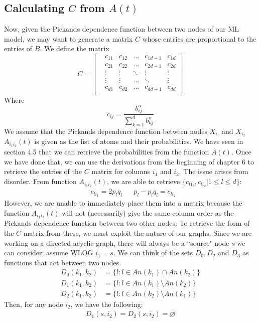 \documentclass[12pt]{article}
\theoremstyle{definition}
\theoremstyle{definition}
\begin{document}
\subsection{Calculating $C$ from $A(t)$}
Now, given the Pickands dependence function between two nodes of our ML model, we may want to generate a matrix $C$ whose entries are proportional to the entries of $B$. We define the matrix
\[ C=\begin{bmatrix}
&c_{11} &c_{12}&\hdots& c_{1d-1}& c_{1d}\\
&c_{21} &c_{22}&\hdots& c_{2d-1}& c_{2d}\\
&\vdots&\vdots&\ddots & \vdots& \vdots \\
&\vdots&\vdots&\hdots & \ddots& \vdots \\
&c_{d1}& c_{d2} & \hdots &c_{dd-1}& c_{dd}\\
\end{bmatrix}
\]
Where  $$c_{ij}=\frac{b^\alpha_{ij}}{\sum_{k=1}^db_{kj}^\alpha}$$
We assume that the Pickands dependence function between nodes $X_{i_1}$ and $X_{i_2}$ $A_{i_1i_2}(t)$ is given as the list of atoms and their probabilities. We have seen in section 4.5 that we can retrieve the probabilities from the function $A(t)$. Once we have done that, we can use the derivations from the beginning of chapter 6 to retrieve the entries of the $C$ matrix for columns $i_1$ and $i_2$. The issue arises from disorder. From function $A_{i_1i_2}(t)$, we are able to retrieve $\{c_{l1_i}, c_{li_2}| 1\leq l\leq d\}$:
\begin{align*}
    &c_{li_1}=2p_lq_l && p_l-p_lq_l=c_{li_2}
\end{align*}
However, we are unable to immediately place them into a matrix because the function $A_{i_1i_2}(t)$ will not (necessarily) give the same column order as the Pickands dependence function between two other nodes. To retrieve the form of the $C$ matrix from these, we must exploit the nature of our graphs. Since we are working on a directed acyclic graph, there will always be a ``source" node $s$ we can consider; assume WLOG $i_1=s$. We can think of the sets $D_0, D_2$ and $D_3$ as functions that act between two nodes. 
\begin{align*}
    D_0(k_1,k_2)&=\{l:l\in An(k_1)\cap An(k_2)\}\\
    D_1(k_1,k_2)&=\{l:l\in An(k_1)\setminus An(k_2)\}\\
    D_2(k_1,k_2)&=\{l:l\in An(k_2)\setminus An(k_1)\}
\end{align*}
Then, for any node $i_2$, we have the following:
\begin{align*}
    D_1(s,i_2)=D_2(s,i_2)=\varnothing
\end{align*}
\end{document}
